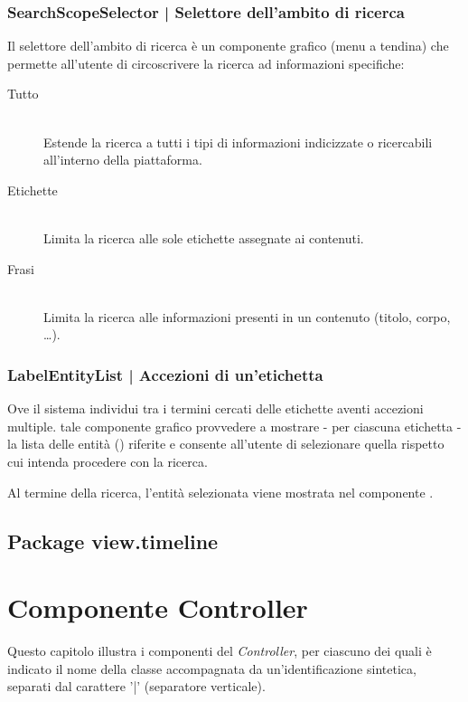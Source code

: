 \documentclass[10pt,a4paper,headinclude,footinclude,hidelinks]{scrreprt} %
\begin{document}
	\subsection[SearchScopeSelector]{SearchScopeSelector | Selettore dell'ambito di ricerca}
	\label{sec:stage:design:sistema:view.search:search-scope-selector}
	Il selettore dell'ambito di ricerca è un componente grafico (menu a tendina) che permette all'utente di circoscrivere la ricerca ad informazioni specifiche:
	\begin{description}
	\item[Tutto] \hfill \\
	Estende la ricerca a tutti i tipi di informazioni indicizzate o ricercabili all'interno della piattaforma.
 	\item[Etichette] \hfill \\
	Limita la ricerca alle sole etichette assegnate ai contenuti.
	\item[Frasi] \hfill \\
	Limita la ricerca alle informazioni presenti in un contenuto (titolo, corpo, \ldots).
	\end{description}

	\subsection[LabelEntityList]{LabelEntityList | Accezioni di un'etichetta}
	\label{sec:stage:design:sistema:view.search:label-entity-list}
	Ove il sistema individui tra i termini cercati delle etichette aventi accezioni multiple. tale componente grafico provvedere a mostrare - per ciascuna etichetta - la lista delle entità (\textit{}) riferite e consente all'utente di selezionare quella rispetto cui intenda procedere con la ricerca.

	Al termine della ricerca, l'entità selezionata viene mostrata nel componente \textit{}.

	\section{Package view.timeline}
	\label{sec:stage:design:sistema:view.timeline}

	\chapter{Componente Controller}
	\label{ch:stage:design:controller}
	Questo capitolo illustra i componenti del \textit{Controller}, per ciascuno dei quali è indicato il nome della classe accompagnata da un'identificazione sintetica, separati dal carattere '|' (separatore verticale).
\end{document}
